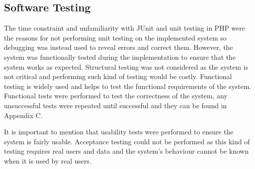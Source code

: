 \documentclass{article}
\begin{document}
\subsection{Software Testing}
The time constraint and unfamiliarity with JUnit and unit testing in PHP were the reasons for not performing unit testing on the implemented system so debugging was instead used to reveal errors and correct them. However, the system was functionally tested during the implementation to ensure that the system works as expected. Structural testing was not considered as the system is not critical and performing such kind of testing would be costly. Functional testing is widely used and helps to test the functional requirements of the system. Functional tests were performed to test the correctness of the system, any unsuccessful tests were repeated until successful and they can be found in Appendix C. \par
It is important to mention that usability tests were performed to ensure the system is fairly usable. Acceptance testing could not be performed as this kind of testing requires real users and data and the system's behaviour cannot be known when it is used by real users. 

\newpage
\end{document}
